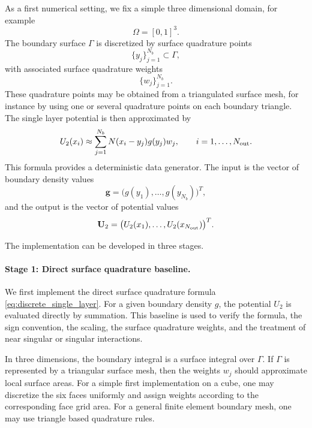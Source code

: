 \documentclass[11pt]{article}
\numberwithin{equation}{section}
\begin{document}
As a first numerical setting, we fix a simple three dimensional domain, for example
\begin{equation}
    \Omega = [0,1]^3.
\end{equation}
The boundary surface \(\Gamma\) is discretized by surface quadrature points
\begin{equation}
    \{y_j\}_{j=1}^{N_b} \subset \Gamma,
\end{equation}
with associated surface quadrature weights
\begin{equation}
    \{w_j\}_{j=1}^{N_b}.
\end{equation}
These quadrature points may be obtained from a triangulated surface mesh, for instance by using one or several quadrature points on each boundary triangle. The single layer potential is then approximated by
\begin{equation}
    U_2(x_i)
    \approx
    \sum_{j=1}^{N_b}
    N(x_i-y_j) g(y_j) w_j,
    \qquad i=1,\ldots,N_{\rm out}.
    \label{eq:discrete_single_layer}
\end{equation}
This formula provides a deterministic data generator. The input is the vector of boundary density values
\begin{equation}
    \mathbf{g}
    =
    \bigl(g(y_1),\ldots,g(y_{N_b})\bigr)^T,
\end{equation}
and the output is the vector of potential values
\begin{equation}
    \mathbf{U}_2
    =
    \bigl(U_2(x_1),\ldots,U_2(x_{N_{\rm out}})\bigr)^T.
\end{equation}

The implementation can be developed in three stages.

\paragraph{Stage 1: Direct surface quadrature baseline.}
We first implement the direct surface quadrature formula \eqref{eq:discrete_single_layer}. For a given boundary density \(g\), the potential \(U_2\) is evaluated directly by summation. This baseline is used to verify the formula, the sign convention, the scaling, the surface quadrature weights, and the treatment of near singular or singular interactions.

In three dimensions, the boundary integral is a surface integral over \(\Gamma\). If \(\Gamma\) is represented by a triangular surface mesh, then the weights \(w_j\) should approximate local surface areas. For a simple first implementation on a cube, one may discretize the six faces uniformly and assign weights according to the corresponding face grid area. For a general finite element boundary mesh, one may use triangle based quadrature rules.
\end{document}
